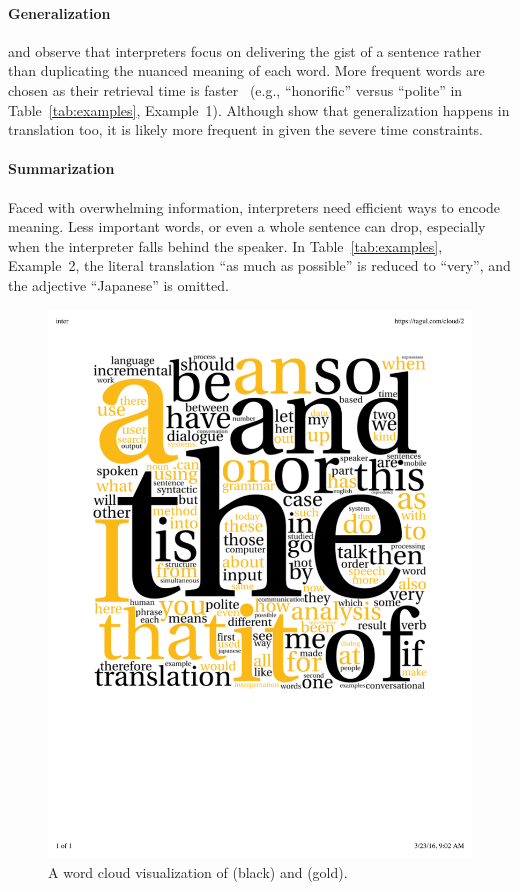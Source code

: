 \paragraph{Generalization}

 and  observe that interpreters
focus on delivering the gist of a sentence rather than duplicating the
nuanced meaning of each word.  More frequent words are chosen as their
retrieval time is faster~\cite{dell92access,cuetos06access} (e.g.,
``honorific'' versus ``polite'' in Table~\ref{tab:examples},
Example~1).  Although  show that
generalization happens in translation too, it is likely more frequent
in \inter{} given the severe time constraints.

\paragraph{Summarization}

Faced with overwhelming information, interpreters need efficient ways to
encode meaning.  Less important words, or even a whole sentence can drop,
especially when the interpreter falls behind the speaker.  In
Table~\ref{tab:examples}, Example~2, the literal translation ``as much as
possible'' is reduced to ``very'', and the adjective ``Japanese'' is omitted.

\begin{figure}
\centering
\includegraphics[width=0.7\linewidth]{2016_naacl_interpretese/figures/wordle.pdf}
\caption{A word cloud visualization of \inter{} (black) and \trans{} (gold).}
\label{fig:wordle}
\end{figure}



